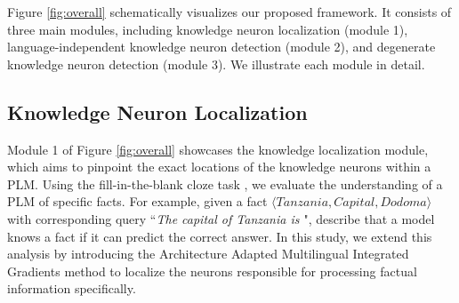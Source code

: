 \documentclass[]{article}
\begin{document}
Figure \ref{fig:overall} schematically visualizes our proposed framework. It consists of three main modules, including knowledge neuron localization (module 1), language-independent knowledge neuron detection (module 2), and degenerate knowledge neuron detection (module 3). We illustrate each module in detail.
\subsection{Knowledge Neuron Localization}
Module 1 of Figure \ref{fig:overall} showcases the knowledge localization module, which aims to pinpoint the exact locations of the knowledge neurons within a PLM. Using the fill-in-the-blank cloze task \cite{fill-in-the-blank}, we evaluate the understanding of a PLM of specific facts. For example, given a fact $\langle \textit{Tanzania}, \textit{Capital}, \textit{Dodoma} \rangle$ with corresponding query ``\textit{The capital of Tanzania is \underline{\hspace{0.4cm}}}", \citeauthor{fill-in-the-blank} describe that a model knows a fact if it can predict the correct answer. In this study, we extend this analysis by introducing the Architecture Adapted Multilingual Integrated Gradients method to localize the neurons responsible for processing factual information specifically.
\end{document}
